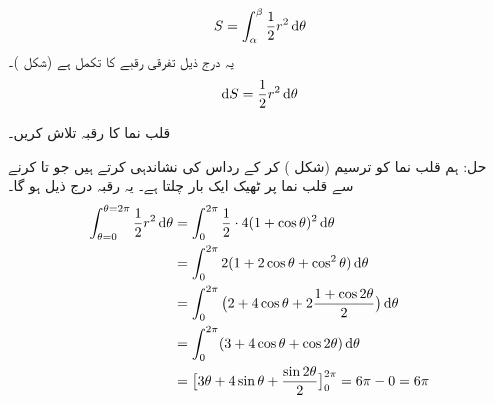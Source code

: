\\
\begin{align*}
S=\int_{\alpha}^{\beta}\frac{1}{2}r^2\dif\theta
\end{align*}
یہ درج ذیل تفرقی رقبے کا تکمل ہے (شکل )۔
\begin{align*}
\dif S=\frac{1}{2}r^2\dif\theta
\end{align*}

قلب نما  کا رقبہ تلاش کریں۔

حل:\quad
ہم قلب نما کو ترسیم (شکل ) کر کے رداس   کی نشاندہی کرتے ہیں جو  تا  کرنے سے قلب نما پر ٹھیک ایک بار چلتا ہے۔ یہ رقبہ درج ذیل ہو گا۔
\begin{align*}
\int_{\theta=0}^{\theta=2\pi}\frac{1}{2}r^2\dif\theta&=\int_{0}^{2\pi}\frac{1}{2}\cdot 4(1+\cos\theta)^2\dif \theta\\
&=\int_0^{2\pi}2(1+2\cos\theta+\cos^2\theta)\dif \theta\\
&=\int_0^{2\pi}\big(2+4\cos\theta+2\frac{1+\cos2\theta}{2}\big)\dif\theta\\
&=\int_0^{2\pi}(3+4\cos\theta+\cos2\theta)\dif\theta\\
&=\big[3\theta+4\sin\theta+\frac{\sin2\theta}{2}\big]_0^{2\pi}=6\pi-0=6\pi
\end{align*}
